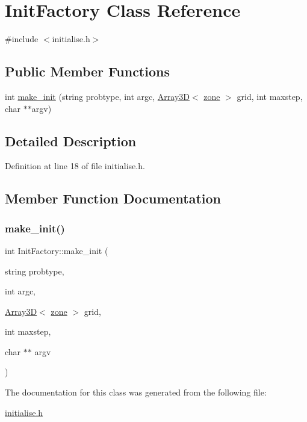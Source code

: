 \hypertarget{classInitFactory}{}\section{Init\+Factory Class Reference}
\label{classInitFactory}


{\ttfamily \#include $<$initialise.\+h$>$}

\subsection*{Public Member Functions}
\begin{DoxyCompactItemize}
\item 
int \hyperlink{classInitFactory_ab0470bd7656cddce43ee242db736085b}{make\+\_\+init} (string probtype, int argc, \hyperlink{classTNT_1_1Array3D}{Array3D}$<$ \hyperlink{structzone}{zone} $>$ grid, int maxstep, char $\ast$$\ast$argv)
\end{DoxyCompactItemize}


\subsection{Detailed Description}


Definition at line 18 of file initialise.\+h.



\subsection{Member Function Documentation}
\mbox{\label{classInitFactory_ab0470bd7656cddce43ee242db736085b}} 
\subsubsection{\texorpdfstring{make\+\_\+init()}{make\_init()}}
{\footnotesize\ttfamily int Init\+Factory\+::make\+\_\+init (\begin{DoxyParamCaption}\item[{string}]{probtype,  }\item[{int}]{argc,  }\item[{\hyperlink{classTNT_1_1Array3D}{Array3D}$<$ \hyperlink{structzone}{zone} $>$}]{grid,  }\item[{int}]{maxstep,  }\item[{char $\ast$$\ast$}]{argv }\end{DoxyParamCaption})}



The documentation for this class was generated from the following file\+:\begin{DoxyCompactItemize}
\item 
\hyperlink{initialise_8h}{initialise.\+h}\end{DoxyCompactItemize}

